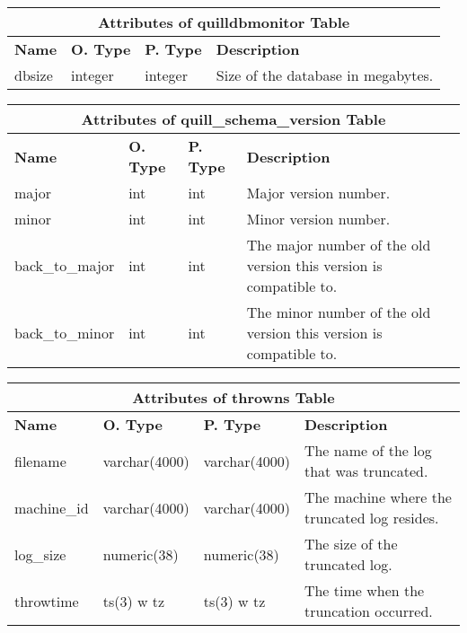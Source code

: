 \begin{center}
  \begin{tabular}{|l|l|l|p{4.1in}|}\hline
    \multicolumn{4}{|c|}{\textbf{Attributes of quilldbmonitor Table}}\\ \hline
    \textbf{Name} & \textbf{O. Type} & \textbf{P. Type} & \textbf{Description}\\ \hline
    dbsize & integer & integer & Size of the database in megabytes.\\ \hline
  \end{tabular}
\vspace{24pt}

  \begin{tabular}{|l|l|l|p{3.6in}|}\hline
    \multicolumn{4}{|c|}{\textbf{Attributes of quill\_schema\_version Table}}\\ \hline
    \textbf{Name} & \textbf{O. Type} & \textbf{P. Type} & \textbf{Description}\\ \hline
    major & int & int & Major version number. \\ \hline
    minor & int & int & Minor version number. \\ \hline
    back\_to\_major & int & int & The major number of the old version this version is compatible to. \\ \hline
    back\_to\_minor & int & int & The minor number of the old version this version is compatible to. \\ \hline
  \end{tabular}
\vspace{24pt}

  \begin{tabular}{|l|l|l|p{3.2in}|}\hline
    \multicolumn{4}{|c|}{\textbf{Attributes of throwns Table}}\\ \hline
    \textbf{Name} & \textbf{O. Type} & \textbf{P. Type} & \textbf{Description}\\ \hline
    filename & varchar(4000) & varchar(4000) & The name of the log that was truncated. \\ \hline
    machine\_id & varchar(4000) & varchar(4000) & The machine where the truncated log resides. \\ \hline
    log\_size & numeric(38) & numeric(38) & The size of the truncated log. \\ \hline
    throwtime & ts(3) w tz & ts(3) w tz & The time when the truncation occurred. \\ \hline
  \end{tabular}
\vspace{24pt}
\end{center}


